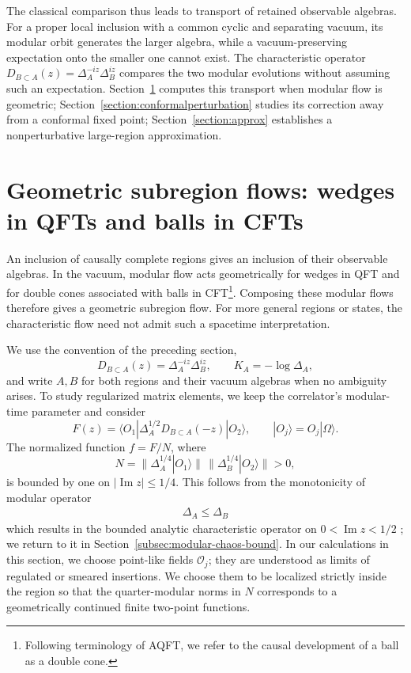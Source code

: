 \documentclass[a4paper,11pt]{article}
\theoremstyle{definition}
\newcommand{\mO}{\mathcal{O}}
\newcommand{\NL}[1]{\textcolor{blue}{#1}}
\begin{document}




The classical comparison thus leads to transport of retained observable algebras.
For a proper local inclusion with a common cyclic and separating vacuum, its
modular orbit generates the larger algebra, while a vacuum-preserving expectation
onto the smaller one cannot exist. The characteristic operator
$D_{B\subset A}(z)=\Delta_A^{-iz}\Delta_B^{iz}$ compares the two modular evolutions
without assuming such an expectation.
Section~\ref{sec:geometric-subregion-flows} computes this transport when modular
flow is geometric; Section~\ref{section:conformalperturbation} studies its correction
away from a conformal fixed point; Section~\ref{section:approx} establishes a
nonperturbative large-region approximation.

\section{Geometric subregion flows: wedges in QFTs and balls in CFTs}
\label{sec:geometric-subregion-flows}

An inclusion of causally complete regions gives an inclusion of their observable algebras. In the vacuum, modular flow acts geometrically for wedges in QFT and for double cones associated with balls in CFT\footnote{Following terminology of AQFT, we refer to the causal development of a ball as a double cone.}. Composing these modular flows therefore gives a geometric subregion flow. For more general regions or states, the characteristic flow need not admit such a spacetime interpretation.

We use the convention of the preceding section,
\[
 D_{B\subset A}(z)=\Delta_A^{-iz}\Delta_B^{iz},
 \qquad K_A=-\log\Delta_A,
\]
and write $A,B$ for both regions and their vacuum algebras when no ambiguity arises. To study regularized matrix elements, we keep the correlator's modular-time parameter and consider
\[
 F(z)=\langle O_1|\Delta_A^{1/2}D_{B\subset A}(-z)|O_2\rangle,
 \qquad |O_j\rangle=O_j|\Omega\rangle.
\]
The normalized function $f=F/N$, where
\[
 N=\|\Delta_A^{1/4}|O_1\rangle\|\,
   \|\Delta_B^{1/4}|O_2\rangle\|>0,
\]
is bounded by one on $|\operatorname{Im}z|\leq 1/4$. This follows from the monotonicity of modular operator
\begin{align}
\Delta_A\leq \Delta_B
\end{align}
which results in the bounded analytic characteristic operator on $0<\operatorname{Im}z<1/2$ \cite{revolutionizing}; we return to it in Section~\ref{subsec:modular-chaos-bound}. In our calculations in this section, we choose point-like fields $\mO_j$; they are understood as limits of regulated or smeared insertions. We choose them to be localized strictly inside the region so that the quarter-modular norms   in $N$ corresponds to a geometrically continued finite two-point functions.
\end{document}
